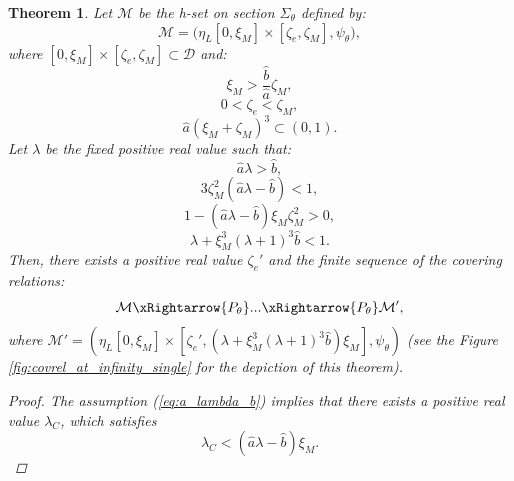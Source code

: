 \documentclass[1p]{article}
\newtheorem{theorem}{Theorem}
\begin{document}
\begin{theorem}
    \label{thm:M_covrel}
    Let $\mathcal{M}$ be the h-set on section $\Sigma_\theta$ defined by:
    \[
        \mathcal{M} = \big( \eta_{L} [0, \xi_M] \times [\zeta_e, \zeta_M], \psi_\theta \big),
    \]
    where $[0, \xi_M] \times [\zeta_e, \zeta_M] \subset \mathcal{D}$ and:
    \begin{equation}
        \label{eq:w_b_a_xi}
        \xi_M > \frac{\hat{b}}{\hat{a}} \zeta_M,
    \end{equation}
    \begin{equation}
        \label{eq:zeta_e_M}
        0 < \zeta_e < \zeta_M,
    \end{equation}
    \begin{equation}
        \label{eq:a_w_xi_3}
        \hat{a} \left( \xi_M + \zeta_M \right)^3 \subset (0, 1).
    \end{equation}
    Let $\lambda$ be the fixed positive real value such that:
    \begin{equation}
        \label{eq:a_lambda_b}
        \hat{a}\lambda > \hat{b},
    \end{equation}
    \begin{equation}
        \label{eq:y_y3_inc}
        3 \zeta_M^2 \left( \hat{a}\lambda - \hat{b} \right) < 1,
    \end{equation}
    \begin{equation}
        \label{eq:a_lambda_b_w_xi}
        1 - \left( \hat{a} \lambda - \hat{b} \right) \xi_M \zeta_M^2 > 0,
    \end{equation}
    \begin{equation}
        \label{eq:lambda_xi_M_3}
        \lambda + \xi_M^3 \left( \lambda + 1 \right)^3 \hat{b} < 1.
    \end{equation}
    Then, there exists a positive real value $\zeta_e'$ and the finite sequence of the covering relations:
    \[
        \mathcal{M} \xRightarrow{P_\theta} ... \xRightarrow{P_\theta} \mathcal{M'},
    \]
    where $\mathcal{M'} = \left( \eta_{L} \left[ 0, \xi_M \right] \times \left[\zeta_e', \left(\lambda + \xi_M^3 (\lambda + 1)^3 \hat{b} \right) \xi_M \right], \psi_\theta \right)$ (see the Figure \ref{fig:covrel_at_infinity_single} for the depiction of this theorem).
    \begin{proof}
        The assumption (\ref{eq:a_lambda_b}) implies that there exists a positive real value $\lambda_C$, which satisfies
        \begin{equation}
            \label{eq:c_lambda}
            \lambda_C < \left( \hat{a}\lambda - \hat{b} \right) \xi_M.

\end{equation}
\end{proof}
\end{theorem}
\end{document}
